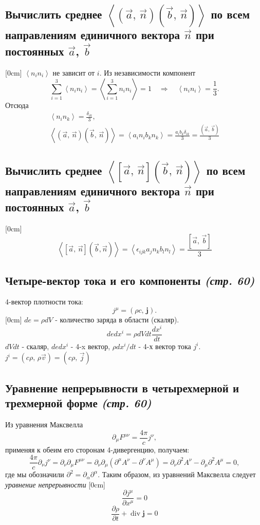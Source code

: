 \documentclass[a4paper,12pt]{article}
\begin{document}
\subsection{Вычислить среднее $\left<\left(\vec{a},\,\vec{n}\right)
\left( \vec{b},\,\vec{n} \right) \right>$ по всем направлениям единичного
вектора $\vec{n}$ при постоянных  $\vec{a}$, $\vec{b}$}
[0cm]
$\left< n_i n_i\right>$ не зависит от $i$. Из независимости компонент 
\[
\sum_{i=1}^3\left< n_i n_i\right>=\left<\sum_{i=1}^3 n_i n_i\right>=1
\quad \Rightarrow \quad \left< n_i n_i\right>=\frac{1}{3}.
\]
Отсюда 
\begin{gather*}
	\left< n_i n_k\right>=\frac{\delta_{ik}}{3},\\
	\left<\left(\vec{a},\,\vec{n}\right)
\left(\vec{b}
,\,\vec{n}\right)\right>=\left< a_i n_i b_k n_k\right>=\frac{a_i b_k \delta_{ik}}{3}=
\frac{\left(\vec{a},\,\vec{b}\right)}{3}
\end{gather*}
\subsection{Вычислить среднее $\left<\left[\vec{a},\,\vec{n}\right]
\left( \vec{b},\,\vec{n} \right) \right>$ по всем направлениям единичного
вектора $\vec{n}$ при постоянных  $\vec{a}$, $\vec{b}$}
[0cm]
\[
	\left<[\vec{a},\,\vec{n}]\left(\vec{b},\vec{n}\right)\right>=\left<
	\epsilon_{ijk}
	a_j n_k b_l n_l\right>=\frac{\left[\vec{a},\,\vec{b}\right]}{3}
\]
\subsection{Четыре-вектор тока и его компоненты \emph{(стр. 60)}}
4-вектор плотности тока:
\[
	j^\mu=(\rho c,\,\mathbf{j})
.\] 
[0cm]
$de=\rho dV$ - количество заряда в области (скаляр).
\[
de dx^i=\rho dV dt \frac{dx^i}{dt}
\]
$dV dt$ - скаляр, $de dx^i$ - 4-x вектор, $\rho dx^i/dt$ - 4-х вектор тока $j^i$.
$j^i=\left(c\rho,\,\rho\vec{v}\right)=\left(c\rho,\,\vec{j}\right)$
\subsection{Уравнение непрерывности в четырехмерной и трехмерной форме 
\emph{(стр. 60)}}
Из уравнения Максвелла
\[
	\partial_\mu F^{\mu\nu}=\frac{4\pi}{c}j^\nu
,\] 
применяя к обеим его сторонам 4-дивергенцию, получаем:
\[
\frac{4\pi}{c}\partial_\nu j^\nu=\partial_\nu \partial_\mu F^{\mu\nu}=
\partial_\nu \partial_\mu (\partial^{\mu} A^\nu-\partial^\nu A^\mu)=
\partial_\nu \partial^2 A^\nu-\partial_\mu \partial^2 A^\mu=0
,\] 
где мы обозначили $\partial^2=\partial_\alpha \partial^\alpha$. Таким образом,
из уравнений Максвелла следует \emph{уравнение непрерывности}
[0cm]
\[\frac{\partial j^\mu}{\partial x^\mu}=0\]
\[
\frac{\partial \rho}{\partial t}+\operatorname{div} \mathbf{j}=0
\]
\end{document}
